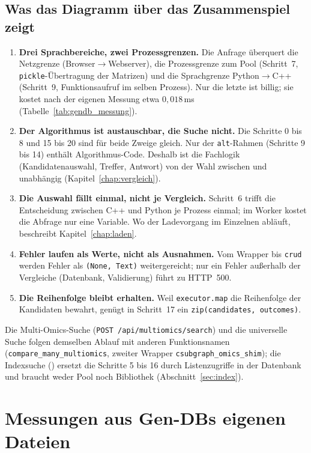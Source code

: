\subsection*{Was das Diagramm über das Zusammenspiel zeigt}

\begin{enumerate}
	\item \textbf{Drei Sprachbereiche, zwei Prozessgrenzen.} Die Anfrage überquert die Netzgrenze (Browser$\to$Webserver), die Prozessgrenze zum Pool (Schritt~7, \texttt{pickle}-Übertragung der Matrizen) und die Sprachgrenze Python$\to$C++ (Schritt~9, Funktionsaufruf im selben Prozess). Nur die letzte ist billig; sie kostet nach der eigenen Messung etwa $0{,}018$\,ms (Tabelle~\ref{tab:gendb_messung}).
	\item \textbf{Der Algorithmus ist austauschbar, die Suche nicht.} Die Schritte 0 bis 8 und 15 bis 20 sind für beide Zweige gleich. Nur der \texttt{alt}-Rahmen (Schritte 9 bis 14) enthält Algorithmus-Code. Deshalb ist die Fachlogik (Kandidatenauswahl, Treffer, Antwort) von der Wahl zwischen  und  unabhängig (Kapitel~\ref{chap:vergleich}).
	\item \textbf{Die Auswahl fällt einmal, nicht je Vergleich.} Schritt~6 trifft die Entscheidung zwischen C++ und Python je Prozess einmal; im Worker kostet die Abfrage nur eine Variable. Wo der Ladevorgang im Einzelnen abläuft, beschreibt Kapitel~\ref{chap:laden}.
	\item \textbf{Fehler laufen als Werte, nicht als Ausnahmen.} Vom Wrapper bis \texttt{crud} werden Fehler als \texttt{(None, Text)} weitergereicht; nur ein Fehler außerhalb der Vergleiche (Datenbank, Validierung) führt zu HTTP~500.
	\item \textbf{Die Reihenfolge bleibt erhalten.} Weil \texttt{executor.map} die Reihenfolge der Kandidaten bewahrt, genügt in Schritt~17 ein \texttt{zip(candidates, outcomes)}.
\end{enumerate}

Die Multi-Omics-Suche (\texttt{POST /api/multiomics/search}) und die universelle Suche folgen demselben Ablauf mit anderen Funktionsnamen (\texttt{compare\_many\_multiomics}, zweiter Wrapper \texttt{csubgraph\_omics\_shim}); die Indexsuche () ersetzt die Schritte 5 bis 16 durch Listenzugriffe in der Datenbank und braucht weder Pool noch Bibliothek (Abschnitt~\ref{sec:index}).

\section{Messungen aus Gen-DBs eigenen Dateien}
\label{sec:messungen}

